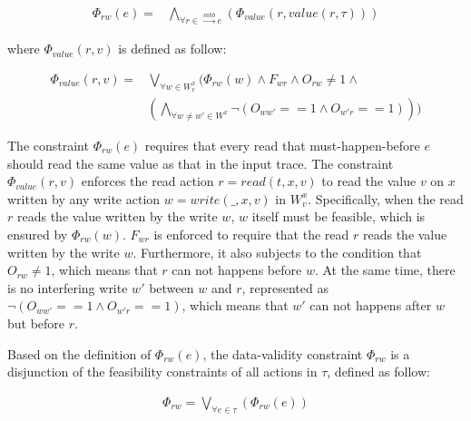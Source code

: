 \documentclass[preprint, numbers, 10pt]{sigplanconf}
\begin{document}
\begin{equation}
\begin{aligned}
\Phi_{rw}(e) ={} & \bigwedge_{\forall r\in \stackrel{mhb}{\longrightarrow} e} 
					(\Phi_{value}(r,value(r,\tau)))
\end{aligned}
\end{equation} 

where $\Phi_{value}(r,v)$ is defined as follow: 

\begin{equation}
\begin{aligned}
\Phi_{value}(r,v) ={} & \bigvee_{\forall w\in W_v^x} (\Phi_{rw}(w)\wedge F_{wr}\wedge 
					  O_{rw}\neq 1\wedge \\
					& (\bigwedge_{\forall w\neq w'\in W^x}\neg (O_{ww'}==1\wedge O_{w'r}==1)))
\end{aligned}
\end{equation}

The constraint $\Phi_{rw}(e)$ requires that every read that must-happen-before 
$e$ should read the same value as that in the input trace. 
The constraint $\Phi_{value}(r,v)$ enforces the read action $r=read(t ,x,v)$ 
to read the value $v$ on $x$ written by any write action $w =write(\_,x,v)$ in $W^x_v$.
Specifically, when the read $r$ reads the value written by the write $w$,
$w$ itself must be feasible, which is ensured by $\Phi_{rw}(w)$. 
$F_{wr}$ is enforced to require that the read $r$ reads the value written by the write $w$. 
Furthermore, it also subjects to the condition that $O_{rw}\neq 1$, which means that $r$ can
not happens before $w$. %
At the same time, there is no interfering write $w'$ between $w$ and $r$, represented as 
$\neg (O_{ww'}==1\wedge O_{w'r}==1)$, which means that 
$w'$ can not happens after $w$ but before $r$.

Based on the definition of $\Phi_{rw}(e)$, the data-validity constraint $\Phi_{rw}$
is a disjunction of the feasibility constraints of all actions in $\tau$, defined as follow:

\begin{equation}
\begin{aligned}
\Phi_{rw} = \bigvee_{\forall e\in \tau} (\Phi_{rw}(e))
\end{aligned}
\end{equation} 
\end{document}
